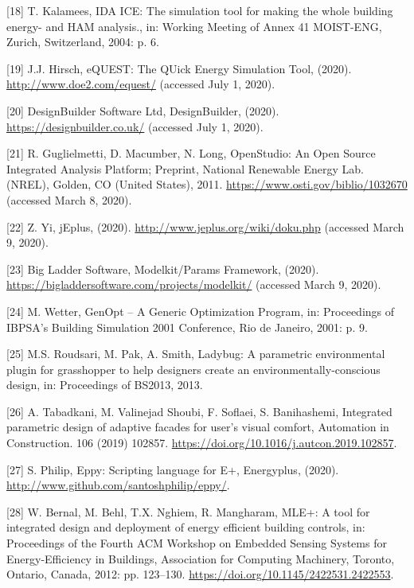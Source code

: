 \documentclass[3p, times]{elsarticle} %
\begin{document}
\leavevmode\hypertarget{ref-Kalamees2004}{}%
{[}18{]} T. Kalamees, IDA ICE: The simulation tool for making the whole building energy- and HAM analysis., in: Working Meeting of Annex 41 MOIST-ENG, Zurich, Switzerland, 2004: p. 6.

\leavevmode\hypertarget{ref-Hirsch2020}{}%
{[}19{]} J.J. Hirsch, eQUEST: The QUick Energy Simulation Tool, (2020). \url{http://www.doe2.com/equest/} (accessed July 1, 2020).

\leavevmode\hypertarget{ref-DesignBuilderSoftwareLtd2020a}{}%
{[}20{]} DesignBuilder Software Ltd, DesignBuilder, (2020). \url{https://designbuilder.co.uk/} (accessed July 1, 2020).

\leavevmode\hypertarget{ref-Guglielmetti2011}{}%
{[}21{]} R. Guglielmetti, D. Macumber, N. Long, OpenStudio: An Open Source Integrated Analysis Platform; Preprint, National Renewable Energy Lab. (NREL), Golden, CO (United States), 2011. \url{https://www.osti.gov/biblio/1032670} (accessed March 8, 2020).

\leavevmode\hypertarget{ref-Yi2020}{}%
{[}22{]} Z. Yi, jEplus, (2020). \url{http://www.jeplus.org/wiki/doku.php} (accessed March 9, 2020).

\leavevmode\hypertarget{ref-BigLadderSoftware2020}{}%
{[}23{]} Big Ladder Software, Modelkit/Params Framework, (2020). \url{https://bigladdersoftware.com/projects/modelkit/} (accessed March 9, 2020).

\leavevmode\hypertarget{ref-Wetter2001}{}%
{[}24{]} M. Wetter, GenOpt -- A Generic Optimization Program, in: Proceedings of IBPSA's Building Simulation 2001 Conference, Rio de Janeiro, 2001: p. 9.

\leavevmode\hypertarget{ref-Roudsari2013}{}%
{[}25{]} M.S. Roudsari, M. Pak, A. Smith, Ladybug: A parametric environmental plugin for grasshopper to help designers create an environmentally-conscious design, in: Proceedings of BS2013, 2013.

\leavevmode\hypertarget{ref-Tabadkani2019}{}%
{[}26{]} A. Tabadkani, M. Valinejad Shoubi, F. Soflaei, S. Banihashemi, Integrated parametric design of adaptive facades for user's visual comfort, Automation in Construction. 106 (2019) 102857. \url{https://doi.org/10.1016/j.autcon.2019.102857}.

\leavevmode\hypertarget{ref-Philip2020}{}%
{[}27{]} S. Philip, Eppy: Scripting language for E+, Energyplus, (2020). \url{http://www.github.com/santoshphilip/eppy/}.

\leavevmode\hypertarget{ref-Bernal2012}{}%
{[}28{]} W. Bernal, M. Behl, T.X. Nghiem, R. Mangharam, MLE+: A tool for integrated design and deployment of energy efficient building controls, in: Proceedings of the Fourth ACM Workshop on Embedded Sensing Systems for Energy-Efficiency in Buildings, Association for Computing Machinery, Toronto, Ontario, Canada, 2012: pp. 123--130. \url{https://doi.org/10.1145/2422531.2422553}.
\end{document}
